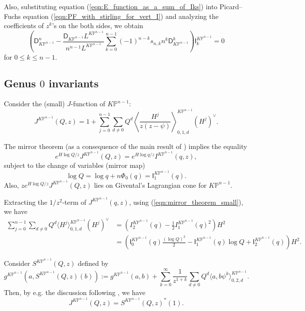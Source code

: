\documentclass[12pt]{amsart}
\numberwithin{equation}{section}
\newcommand{\KP}{K\mathbb{P}}
\begin{document}
Also, substituting equation (\ref{eqn:E_function_as_a_sum_of_Iks}) into Picard--Fuchs equation (\ref{eqn:PF_with_stirling_for_vert_I}) and analyzing the coefficients of $z^k$'s on the both sides, we obtain
\begin{equation}\label{eqn:PF_for_Iks_annihilation}
\left(\mathsf{D}_{\KP^{n-1}}^n-\frac{\mathsf{D}_{\KP^{n-1}}L^{\KP^{n-1}}}{n^{n-1}L^{\KP^{n-1}}}\sum_{k=0}^{n-1}(-1)^{n-k}{s}_{n,k}n^k\mathsf{D}_{\KP^{n-1}}^k\right)\mathsf{I}_k^{\KP^{n-1}}=0
\end{equation}
for $0\leq k \leq n-1$.

\subsection{Genus \texorpdfstring{$0$}{0} invariants}\label{sec:genus0KP}
Consider the (small) $J$-function of $\KP^{n-1}$:
\begin{equation}\label{eqn:small_J}
J^{\KP^{n-1}}(Q,z)=1+\sum_{j=0}^{n-1}\sum_{d\neq 0}Q^d\left\langle\frac{H^j}{z(z-\psi)} \right\rangle_{0,1,d}^{\KP^{n-1}}(H^j)^\vee.    
\end{equation}

The mirror theorem (as a consequence of the main result of \cite{ccit}) implies the equality
\begin{equation}\label{eqn:mirror_theorem_small}
e^{H\log Q/z}J^{\KP^{n-1}}(Q,z) = e^{H\log q/z}I^{\KP^{n-1}}(q,z),
\end{equation}
subject to the change of variables (mirror map)
\begin{equation}\label{eqn:mirror_map_small}
\log Q= \log q + n\Phi_0(q)=\mathsf{I}_1^{\KP^{n-1}}(q).    
\end{equation}
Also, $ze^{H\log Q/z}J^{\KP^{n-1}}(Q,z)$ lies on Givental's Lagrangian cone for $\KP^{n-1}$.

Extracting the $1/z^2$-term of $J^{\KP^{n-1}}(q,z)$, using (\ref{eqn:mirror_theorem_small}), we have 
\begin{equation}\label{eqn:2pt0_small}
\begin{split}
\sum_{j=0}^{n-1}\sum_{d\neq 0} Q^d\langle H^j\rangle_{0,1,d}^{\KP^{n-1}}(H^j)^\vee&= 
\left(I_2^{\KP^{n-1}}(q)-\frac{1}{2}I_1^{\KP^{n-1}}(q)^2\right)H^2\\
&=\left(\mathsf{I}_0^{\KP^{n-1}}(q)\frac{(\log Q)^2}{2}-\mathsf{I}_1^{\KP^{n-1}}(q)\log Q+\mathsf{I}_2^{\KP^{n-1}}(q)\right)H^2.  
\end{split}
\end{equation}


Consider $S^{\KP^{n-1}}(Q,z)$ defined by 
\begin{equation}\label{eqn:defnS}
g^{\KP^{n-1}}(a, S^{\KP^{n-1}}(Q,z)(b)):=g^{\KP^{n-1}}(a,b)+\sum_{k=0}^\infty \frac{1}{z^{1+k}}\sum_{d\neq 0}Q^d\langle a, b\psi^k \rangle_{0,2,d}^{\KP^{n-1}}.        
\end{equation}
Then, by e.g. the discussion following \cite[Equation (5)]{g3}, we have 
\begin{equation}
J^{\KP^{n-1}}(Q, z)=S^{\KP^{n-1}}(Q, z)^*(1).   
\end{equation}
\end{document}
